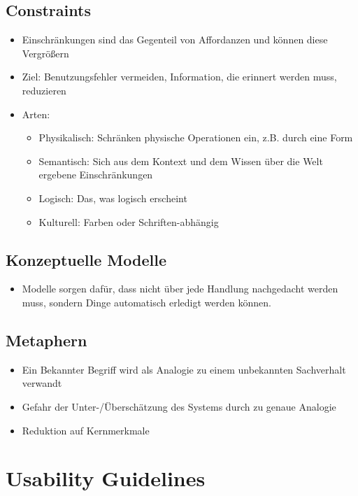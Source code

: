 \documentclass[a4paper,10pt]{article}
\begin{document}
\subsection{Constraints}
\begin{itemize}
	\item Einschränkungen sind das Gegenteil von Affordanzen und können diese Vergrößern
	\item Ziel: Benutzungsfehler vermeiden, Information, die erinnert werden muss, reduzieren
	\item Arten:
	\begin{itemize}
		\item Physikalisch: Schränken physische Operationen ein, z.B. durch eine Form
		\item Semantisch: Sich aus dem Kontext und dem Wissen über die Welt ergebene Einschränkungen
		\item Logisch: Das, was logisch erscheint
		\item Kulturell: Farben oder Schriften-abhängig
	\end{itemize}
\end{itemize}

\subsection{Konzeptuelle Modelle}
\begin{itemize}
	\item Modelle sorgen dafür, dass nicht über jede Handlung nachgedacht werden muss, sondern Dinge automatisch erledigt werden können.
\end{itemize}

\subsection{Metaphern}
\begin{itemize}
	\item Ein Bekannter Begriff wird als Analogie zu einem unbekannten Sachverhalt verwandt
	\item Gefahr der Unter-/Überschätzung des Systems durch zu genaue Analogie
	\item Reduktion auf Kernmerkmale
\end{itemize}

\section{Usability Guidelines}
\end{document}
